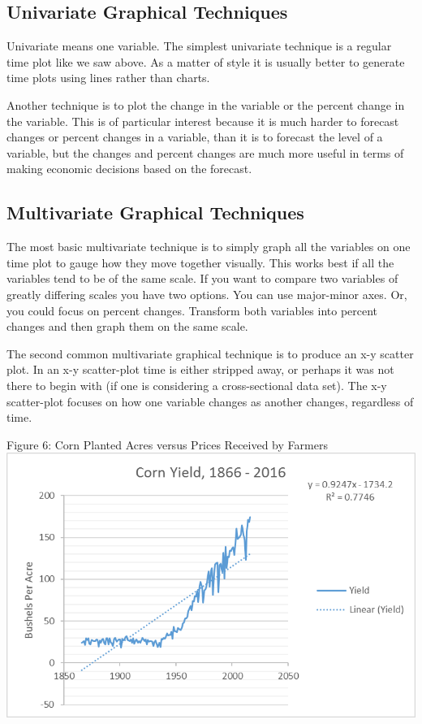 \documentclass[]{book}
\theoremstyle{definition}
\theoremstyle{definition}
\theoremstyle{remark}
\begin{document}
\subsection{Univariate Graphical
Techniques}\label{univariate-graphical-techniques}

Univariate means one variable. The simplest univariate technique is a
regular time plot like we saw above. As a matter of style it is usually
better to generate time plots using lines rather than charts.

Another technique is to plot the change in the variable or the percent
change in the variable. This is of particular interest because it is
much harder to forecast changes or percent changes in a variable, than
it is to forecast the level of a variable, but the changes and percent
changes are much more useful in terms of making economic decisions based
on the forecast.

\subsection{Multivariate Graphical
Techniques}\label{multivariate-graphical-techniques}

The most basic multivariate technique is to simply graph all the
variables on one time plot to gauge how they move together visually.
This works best if all the variables tend to be of the same scale. If
you want to compare two variables of greatly differing scales you have
two options. You can use major-minor axes. Or, you could focus on
percent changes. Transform both variables into percent changes and then
graph them on the same scale.

The second common multivariate graphical technique is to produce an x-y
scatter plot. In an x-y scatter-plot time is either stripped away, or
perhaps it was not there to begin with (if one is considering a
cross-sectional data set). The x-y scatter-plot focuses on how one
variable changes as another changes, regardless of time.

Figure 6: Corn Planted Acres versus Prices Received by Farmers
\includegraphics{Excel-files/ForecastingProduction-HistoricalAcreage_files/image005.png}
\end{document}
